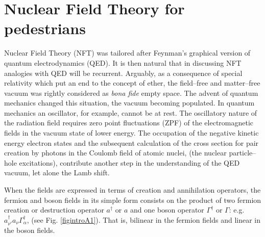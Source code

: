 \section{Nuclear Field Theory for pedestrians}\label{appintroA}


Nuclear Field Theory (NFT) was tailored after Feynman's graphical version of quantum electrodynamics (QED). It is then natural that in discussing NFT analogies with QED will be recurrent.   Arguably, as a consequence of special relativity which put an end to the concept of ether, the field--free and matter--free vacuum was rightly considered as \textit{bona fide} empty space. The advent of quantum mechanics changed this situation, the vacuum becoming populated. In quantum mechanics an oscillator, for example, cannot be at rest. The oscillatory nature of the radiation field requires zero point fluctuations (ZPF) of the electromagnetic fields in the vacuum state of lower energy. The occupation of the negative kinetic energy electron states and the subsequent calculation of the cross section for pair creation by photons in the Coulomb field of atomic nuclei, (the nuclear particle--hole excitations), contribute another step in the understanding of the QED vacuum, let alone the Lamb shift.


When the fields are expressed in terms of creation and annihilation operators, the fermion and boson fields in its simple form consists on the product of two fermion creation or destruction operator $a^\dagger$ or $a$ and one boson operator $\Gamma^\dagger$ or $\Gamma$: e.g. $a^\dagger_{\nu'}a_\nu\Gamma_\alpha^\dagger$, (see Fig. \ref{figintroA1}). That is,  bilinear in the fermion fields and linear in the boson fields.


